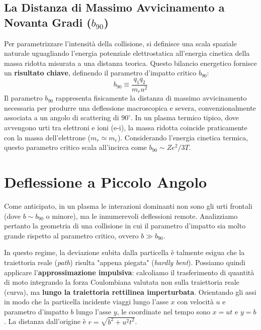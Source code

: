 \subsection{La Distanza di Massimo Avvicinamento a Novanta Gradi ($b_{90}$)}
Per parametrizzare l'intensità della collisione, si definisce una scala spaziale naturale uguagliando l'energia potenziale elettrostatica all'energia cinetica della massa ridotta misurata a una distanza teorica. Questo bilancio energetico fornisce un \textbf{risultato chiave}, definendo il parametro d'impatto critico $b_{90}$:
\begin{equation}
b_{90} \equiv \frac{q_1 q_2}{m_r u^2}
\end{equation}
Il parametro $b_{90}$ rappresenta fisicamente la distanza di massimo avvicinamento necessaria per produrre una deflessione macroscopica e severa, convenzionalmente associata a un angolo di scattering di $90^\circ$.
In un plasma termico tipico, dove avvengono urti tra elettroni e ioni (e-i), la massa ridotta coincide praticamente con la massa dell'elettrone ($m_r \simeq m_e$). Considerando l'energia cinetica termica, questo parametro critico scala all'incirca come $b_{90} \sim Z e^2 / 3T$.

\section{Deflessione a Piccolo Angolo}

Come anticipato, in un plasma le interazioni dominanti non sono gli urti frontali (dove $b \sim b_{90}$ o minore), ma le innumerevoli deflessioni remote. Analizziamo pertanto la geometria di una collisione in cui il parametro d'impatto sia molto grande rispetto al parametro critico, ovvero $b \gg b_{90}$.

In questo regime, la deviazione subita dalla particella è talmente esigua che la traiettoria reale (\textit{path}) risulta "appena piegata" (\textit{hardly bent}). Possiamo quindi applicare l'\textbf{approssimazione impulsiva}: calcoliamo il trasferimento di quantità di moto integrando la forza Coulombiana valutata non sulla traiettoria reale (curva), ma \textbf{lungo la traiettoria rettilinea imperturbata}.
Orientando gli assi in modo che la particella incidente viaggi lungo l'asse $x$ con velocità $u$ e parametro d'impatto $b$ lungo l'asse $y$, le coordinate nel tempo sono $x = ut$ e $y = b$. La distanza dall'origine è $r = \sqrt{b^2 + u^2 t^2}$.

